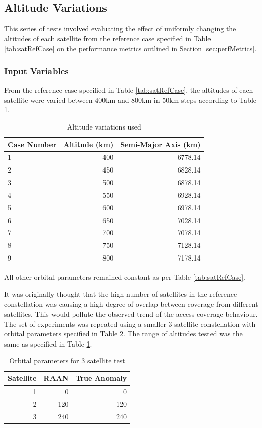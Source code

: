 \newpage
\subsection{Altitude Variations}
This series of tests involved evaluating the effect of uniformly changing the altitudes of each satellite from the reference case specified in Table \ref{tab:satRefCase} on the performance metrics outlined in Section \ref{sec:perfMetrics}.
\subsubsection{Input Variables}
From the reference case specified in Table \ref{tab:satRefCase}, the altitudes of each satellite were varied between 400km and 800km in 50km steps according to Table \ref{tab:altitudeParams}.

\begin{table}[H]
  \centering
  \caption{Altitude variations used}
    \begin{tabular}{p{2.5cm}rr}
    \toprule
    Case Number & Altitude (km) & Semi-Major Axis (km)\\
    \midrule
    1     & 400   & 6778.14 \\
    2     & 450   & 6828.14 \\
    3     & 500   & 6878.14 \\
    4     & 550   & 6928.14 \\
    5     & 600   & 6978.14 \\
    6     & 650   & 7028.14 \\
    7     & 700   & 7078.14 \\
    8     & 750   & 7128.14 \\
    9     & 800   & 7178.14 \\

    \bottomrule
    \end{tabular}%
  \label{tab:altitudeParams}%
\end{table}%
All other orbital parameters remained constant as per Table \ref{tab:satRefCase}.

It was originally thought that the high number of satellites in the reference constellation was causing a high degree of overlap between coverage from different satellites. This would pollute the observed trend of the access-coverage behaviour. The set of experiments was repeated using a smaller 3 satellite constellation with orbital parameters specified in Table \ref{tab:3sat_config}. The range of altitudes tested was the same as specified in Table \ref{tab:altitudeParams}.
\begin{table}[htbp]
  \centering
  \caption{Orbital parameters for 3 satellite test}
    \begin{tabular}{rrr}
    \toprule
    Satellite & RAAN  & True Anomaly \\
    \midrule
    1     & 0     & 0 \\
    2     & 120   & 120 \\
    3     & 240   & 240 \\
    \bottomrule
    \end{tabular}%
  \label{tab:3sat_config}%
\end{table}%



